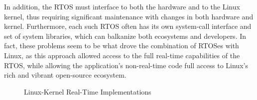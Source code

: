 In addition, the RTOS must interface to both the hardware and to
the Linux kernel, thus requiring significant maintenance with
changes in both hardware and kernel.
Furthermore, each such RTOS often has its own system-call interface
and set of system libraries, which can balkanize both ecosystems and
developers.
In fact, these problems seem to be what drove the combination of
RTOSes with Linux, as this approach allowed access to the full real-time
capabilities of the RTOS, while allowing the application's non-real-time
code full access to Linux's rich and vibrant open-source ecosystem.
\fi

\begin{figure}[p]
\centering
{}
\caption{Linux-Kernel Real-Time Implementations}
\label{fig:advsync:Linux-Kernel Real-Time Implementations}
\end{figure}

